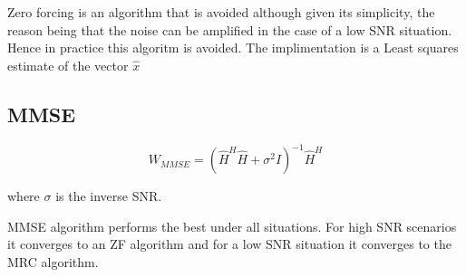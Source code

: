 Zero forcing is an algorithm that is avoided although given its simplicity, the reason being that the noise can be amplified in the case of a low SNR situation. Hence in practice this algoritm is avoided. The implimentation is a Least squares estimate of the vector $\hat{x}$

\subsection{MMSE}\label{ssec:MMSE}

\begin{equation}
    W_{MMSE} = (\hat{H}^H\hat{H}+\sigma^{2}I)^{-1}\hat{H}^H
\end{equation}

where $\sigma$ is the inverse SNR.

MMSE algorithm performs the best under all situations. For high SNR scenarios it converges to an ZF algorithm and for a low SNR situation it converges to the MRC algorithm.

%

